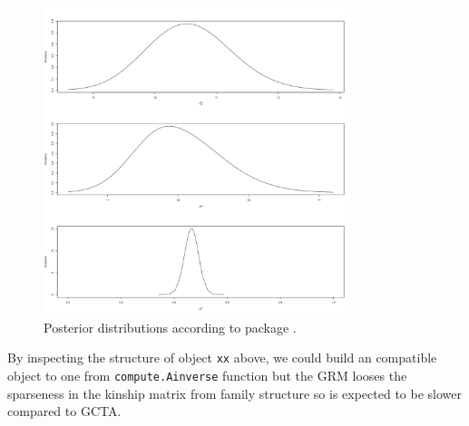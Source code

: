 \documentclass[article]{jss}
\begin{document}
\begin{figure}[t!]
\centering
\includegraphics[width=0.8\textwidth, trim = 0 20 0 20, clip]{h2-017}
\caption{Posterior distributions according to package .}
\label{fgh:animalinla}
\end{figure}

By inspecting the structure of object \texttt{xx} above, we could build 
an compatible object to one from \verb/compute.Ainverse/ function 
but the GRM looses the sparseness in the kinship matrix from family
structure so is expected to be slower compared to GCTA.
\end{document}
